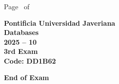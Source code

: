 \documentclass[11pt, addpoints, answers]{exam}\usepackage[utf8]{inputenc}
\begin{document}
\begin{coverpages}
\begin{center}
			\vspace{3mm}
			\leavevmode \hspace{5mm} 
		\end{center}
	\end{coverpages}

	\footer{} {Page \thepage\ of \numpages} {}

	\centering
	\textbf{\Large Pontificia Universidad Javeriana}\\
	\textbf{\Large Databases} \\
	\textbf{\large 2025 -- 10} \\
	\textbf{\large 3rd Exam} \\
	\textbf{Code: DD1B62}


	\begin{questions}
		
		
		
		
		
		
		
		
		
		
		
		
		
		
		
		
		
		
		
		
	\end{questions}

	\vspace{5mm}
	\noindent \textbf{End of Exam}
\end{document}
